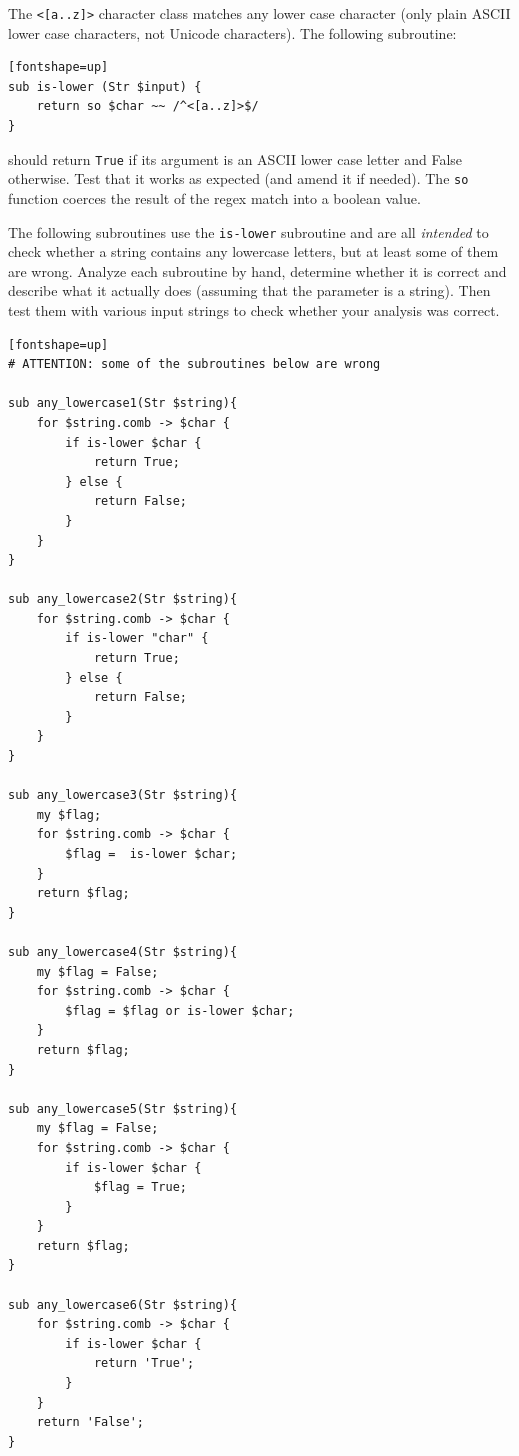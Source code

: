\begin{exercise}

\label{islower}
The \verb'<[a..z]>' character class matches any lower case 
character (only plain ASCII lower case characters, not 
Unicode characters). The following subroutine:

\begin{verbatim}[fontshape=up]
sub is-lower (Str $input) { 
    return so $char ~~ /^<[a..z]>$/
}
\end{verbatim}

should return {\tt True} if its argument is an ASCII lower case 
letter and False otherwise. Test that it works as 
expected (and amend it if needed). The {\tt so} function 
coerces the result of the regex match into a boolean value.

The following subroutines use the {\tt is-lower} subroutine 
and are all {\em intended} to check 
whether a string contains any lowercase letters, but at 
least some of them are wrong.  Analyze each subroutine by hand, 
determine whether it is correct and describe what it 
actually does (assuming that the parameter is a string). Then 
test them with various input strings to check whether your 
analysis was correct.

\begin{verbatim}[fontshape=up]
# ATTENTION: some of the subroutines below are wrong

sub any_lowercase1(Str $string){
    for $string.comb -> $char {
        if is-lower $char {
            return True;
        } else {
            return False;
        }
    }
}

sub any_lowercase2(Str $string){
    for $string.comb -> $char {
        if is-lower "char" {
            return True;
        } else {
            return False;
        }
    }
}

sub any_lowercase3(Str $string){
    my $flag;
    for $string.comb -> $char {
        $flag =  is-lower $char;
    }
    return $flag;
}

sub any_lowercase4(Str $string){
    my $flag = False;
    for $string.comb -> $char {
        $flag = $flag or is-lower $char;
    }
    return $flag;
}

sub any_lowercase5(Str $string){
    my $flag = False;
    for $string.comb -> $char {
        if is-lower $char {
            $flag = True;
        }
    }
    return $flag;
}

sub any_lowercase6(Str $string){
    for $string.comb -> $char {
        if is-lower $char {
            return 'True';
        }
    }
    return 'False';
}


\end{verbatim}
\end{exercise}
